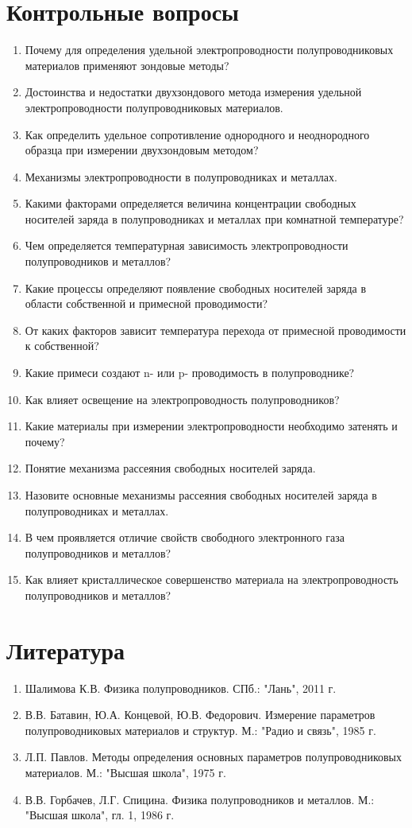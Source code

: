 \section{Контрольные вопросы}
\begin{enumerate}
\item Почему для определения удельной электропроводности полупроводниковых материалов применяют зондовые методы?
\item Достоинства и недостатки двухзондового метода измерения удельной электропроводности полупроводниковых материалов.
\item Как определить удельное сопротивление однородного и неоднородного образца при измерении двухзондовым методом?
\item Механизмы электропроводности в полупроводниках и металлах.
\item Какими факторами определяется величина концентрации свободных носителей заряда в полупроводниках и металлах при комнатной температуре?
\item Чем определяется температурная зависимость электропроводности полупроводников и металлов?
\item Какие процессы определяют появление свободных носителей заряда в области собственной и примесной проводимости?
\item От каких факторов зависит температура перехода от примесной проводимости к собственной?
\item Какие примеси создают n- или p- проводимость в полупроводнике?
\item Как влияет освещение на электропроводность полупроводников?
\item Какие материалы при измерении электропроводности необходимо затенять и почему?
\item Понятие механизма рассеяния свободных носителей заряда.
\item Назовите основные механизмы рассеяния свободных носителей заряда в полупроводниках и металлах.
\item В чем проявляется отличие свойств свободного электронного газа полупроводников и металлов?
\item Как влияет кристаллическое совершенство материала на электропроводность полупроводников и металлов?
\end{enumerate}

\section{Литература}
\begin{enumerate}
\item Шалимова К.В. Физика полупроводников. СПб.: "Лань", 2011 г.
\item В.В. Батавин, Ю.А. Концевой, Ю.В. Федорович. Измерение параметров полупроводниковых материалов и структур. М.: "Радио и связь", 1985 г.
\item Л.П. Павлов. Методы определения основных параметров полупроводниковых материалов. М.: "Высшая школа", 1975 г.
\item В.В. Горбачев, Л.Г. Спицина. Физика полупроводников и металлов. М.: "Высшая школа", гл. 1, 1986 г.
\end{enumerate}
